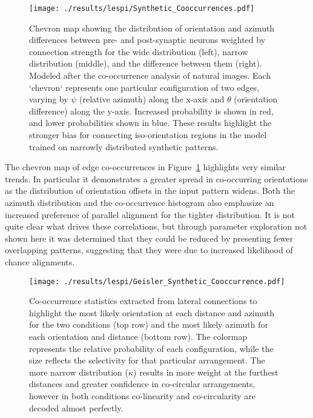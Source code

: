 \begin{figure}
	\centering
        \texttt{[image: ./results/lespi/Synthetic\_Cooccurrences.pdf]}
	\caption[Chevron map showing the distribution of orientation and
      azimuth differences between pre- and post-synaptic
      neurons.]{Chevron map showing the distribution of orientation
      and azimuth differences between pre- and post-synaptic neurons
      weighted by connection strength for the wide distribution
      (left), narrow distribution (middle), and the difference between
      them (right). Modeled after the \cite{Perrinet2015}
      co-occurrence analysis of natural images. Each `chevron`
      represents one particular configuration of two edges, varying by
      $\psi$ (relative azimuth) along the x-axis and $\theta$
      (orientation difference) along the y-axis. Increased probability
      is shown in red, and lower probabilities shown in blue. These
      results highlight the stronger bias for connecting
      iso-orientation regions in the model trained on narrowly
      distributed synthetic patterns.}
	\label{SyntheticCooccurrence}
\end{figure}

The chevron map of edge co-occurrences in
Figure~\ref{SyntheticCooccurrence} highlights very similar trends. In
particular it demonstrates a greater spread in co-occurring
orientations as the distribution of orientation offsets in the input
pattern widens. Both the azimuth distribution and the co-occurrence
histogram also emphasize an increased preference of parallel alignment
for the tighter distribution. It is not quite clear what drives these
correlations, but through parameter exploration not shown here it was
determined that they could be reduced by presenting fewer overlapping
patterns, suggesting that they were due to increased likelihood of
chance alignments.

\begin{figure}
	\centering
    \texttt{[image: ./results/lespi/Geisler\_Synthetic\_Cooccurrence.pdf]}
	\caption{Co-occurrence statistics extracted from lateral
      connections to highlight the most likely orientation at each
      distance and azimuth for the two conditions (top row) and the
      most likely azimuth for each orientation and distance (bottom
      row). The colormap represents the relative probability of each
      configuration, while the size reflects the selectivity for that
      particular arrangement. The more narrow distribution ($\kappa$)
      results in more weight at the furthest distances and greater
      confidence in co-circular arrangements, however in both
      conditions co-linearity and co-circularity are decoded almost
      perfectly. }
	\label{SyntheticGeisler}
\end{figure}

